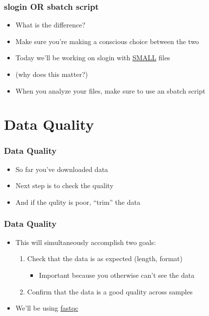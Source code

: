 \documentclass[14pt,handout]{beamer}
\begin{document}
\begin{frame}
\frametitle{slogin OR sbatch script}
\begin{itemize}
	\large
	\item<+-> What is the difference?
	\item<+-> Make sure you're making a conscious choice between the two
	\item<+-> Today we'll be working on slogin with \underline{SMALL} files
	\item<+-> (why does this matter?)
	\item<+-> When you analyze your files, make sure to use an sbatch script
\end{itemize}
\end{frame}

\section{Data Quality}

\begin{frame}
\frametitle{Data Quality}
\begin{itemize}
	\item<+-> So far you've downloaded data
	\item<+-> Next step is to check the quality
	\item<+-> And if the qulity is poor, ``trim'' the data
\end{itemize}
\end{frame}

\begin{frame}
\frametitle{Data Quality}
\begin{itemize}
	\item<+-> This will simultaneously accomplish two goals:
	\begin{enumerate}
		\large
		\item<+-> Check that the data is as expected (length, format)
		\begin{itemize}
			\item<+-> Important because you otherwise can't see the data
		\end{itemize}
		\item<+-> Confirm that the data is a good quality across samples
	\end{enumerate}
	\item<+-> We'll be using \href{https://www.bioinformatics.babraham.ac.uk/projects/fastqc/}{fastqc}
\end{itemize}
\end{frame}
\end{document}
